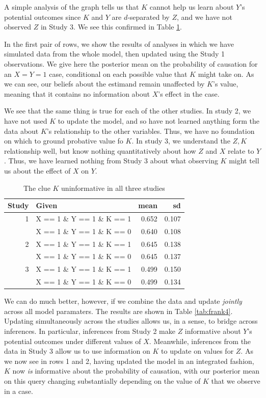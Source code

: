 \documentclass[
  12pt,
]{book}
\begin{document}
A simple analysis of the graph tells us that \(K\) cannot help us learn about \(Y\)'s potential outcomes since \(K\) and \(Y\) are \(d\)-separated by \(Z\), and we have not observed \(Z\) in Study 3. We see this confirmed in Table \ref{tab:frank1}.

In the first pair of rows, we show the results of analyses in which we have simulated data from the whole model, then updated using the Study 1 observations. We give here the posterior mean on the probability of causation for an \(X=Y=1\) case, conditional on each possible value that \(K\) might take on. As we can see, our beliefs about the estimand remain unaffected by \(K\)'s value, meaning that it contains no information about \(X\)'s effect in the case.

We see that the same thing is true for each of the other studies. In study 2, we have not used \(K\) to update the model, and so have not learned anything form the data about \(K\)'s relationship to the other variables. Thus, we have no foundation on which to ground probative value fo \(K\). In study 3, we understand the \(Z,K\) relationship well, but know nothing quantitatively about how \(Z\) and \(X\) relate to \(Y\). Thus, we have learned nothing from Study 3 about what observing \(K\) might tell us about the effect of \(X\) on \(Y\).

\begin{table}

\caption{\label{tab:frank1}The clue $K$ uninformative in all three studies}
\centering
\begin{tabular}[t]{r|l|r|r}
\hline
Study & Given & mean & sd\\
\hline
1 & X == 1 \& Y == 1 \& K == 1 & 0.652 & 0.107\\
\hline
 & X == 1 \& Y == 1 \& K == 0 & 0.640 & 0.108\\
\hline
2 & X == 1 \& Y == 1 \& K == 1 & 0.645 & 0.138\\
\hline
 & X == 1 \& Y == 1 \& K == 0 & 0.645 & 0.137\\
\hline
3 & X == 1 \& Y == 1 \& K == 1 & 0.499 & 0.150\\
\hline
 & X == 1 \& Y == 1 \& K == 0 & 0.499 & 0.134\\
\hline
\end{tabular}
\end{table}

We can do much better, however, if we combine the data and update \emph{jointly} across all model paramaters. The results are shown in Table \ref{tab:frank4}. Updating simultaneously across the studies allows us, in a sense, to bridge across inferences. In particular, inferences from Study 2 make \(Z\) informative about \(Y\)'s potential outcomes under different values of \(X\). Meanwhile, inferences from the data in Study 3 allow us to use information on \(K\) to update on values for \(Z\). As we now see in rows 1 and 2, having updated the model in an integrated fashion, \(K\) now \emph{is} informative about the probability of causation, with our posterior mean on this query changing substantially depending on the value of \(K\) that we observe in a case.
\end{document}
